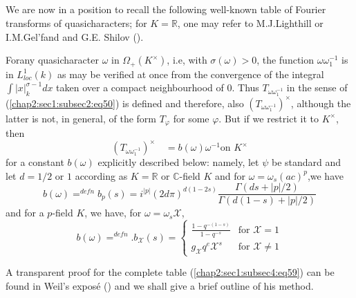 \subsection{}\label{chap2:sec1:subsec4}   %

 We are now in a position to recall the following well-known table of
 Fourier transforms of quasicharacters; for $K=\mathbb{R}$, one may
 refer to M.J.Lighthill \cite{Lig} or I.M.Gel'fand and G.E. Shilov
 (\cite{Gel-Shi}).
 
 For\pageoriginale any quasicharacter $\omega$ in $\Omega_{+}(K^{\times})$, i.e, with
 $\sigma(\omega)>0$, the function $\omega\omega_{1}^{-1}$ is in
 $L_{loc}^{1}(k)$ as may be verified at once from the convergence of
 the integral$\int|x|_{k}^{\sigma-1}dx$ taken over a compact
 neighbourhood of $0$. Thus $T_{\omega\omega_{1}^{-1}}$ in the sense
 of (\ref{chap2:sec1:subsec2:eq50}) is defined and therefore, also
 $(T_{\omega\omega_{1}^{-1}})^{\times}$, although the latter is not, in
 general, of the form $T_{\varphi}$ for some $\varphi$. But if we
 restrict it to $K^{\times}$, then 
\begin{equation*}
  (T_{\omega\omega_{1}^{-1}})^{\times}\quad = b(\omega)\omega^{-1}
  \text{on } K^{\times}\tag{58}\label{chap2:sec1:subsec4:eq58}
\end{equation*}
 for a constant $b(\omega)$ explicitly described below: namely, let
 $\psi$ be standard and let $d=1/2$ or $1$ according as $K=\mathbb{R}$
 or $\mathbb{C}$-field  $K$ and for $\omega=\omega_{s}(ac)^{p}$,we
 have
\begin{equation*}
  b(\omega){\displaystyle{\mathop{=}^{defn}}}b_{p}(s)=i^{|p|}
  (2d\pi)^{d(1-2s)}\frac{\Gamma(ds+|p|/2)}{\Gamma(d(1-s)+|p|/2)}
\end{equation*}
 and for a $p$-field $K$, we have, for $\omega=\omega_{s}\mathcal{X}$,
\begin{equation*}
  b(\omega){\displaystyle{\mathop{=}^{defn}}}.b_{\mathcal{X}}(s)=
  \begin{cases}
    \frac{1-q^{-(1-s)}}{1-q^{-s}}&\text{for }\mathcal{X}=1\\
    g_{\mathcal{X}}q^{e}{\mathcal{X}}^{s}&\text{for }\mathcal{X}\neq 1
  \end{cases}\tag{59}\label{chap2:sec1:subsec4:eq59}
\end{equation*}

 A transparent proof for the complete table (\ref{chap2:sec1:subsec4:eq59}) can be found in
 Weil's expos\'{e} (\cite{Wei 6}) and we shall give a brief outline  of his
 method. 
 
